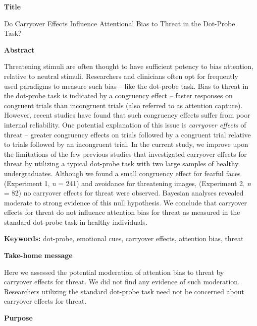 \documentclass{article}
\begin{document}
  \textbf{Title}

Do Carryover Effects Influence Attentional Bias to Threat in the Dot-Probe Task?



\textbf{Abstract}

Threatening stimuli are often thought to have sufficient potency to bias attention, relative to neutral stimuli. Researchers and clinicians often opt for frequently used paradigms to measure such bias -- like the dot-probe task. Bias to threat in the dot-probe task is indicated by a congruency effect -- faster responses on congruent trials than incongruent trials (also referred to as attention capture). However, recent studies have found that such congruency effects suffer from poor internal reliability. One potential explanation of this issue is \emph{carryover effects} of threat -- greater congruency effects on trials followed by a congruent trial relative to trials followed by an incongruent trial. In the current study, we improve upon the limitations of the few previous studies that investigated carryover effects for threat by utilizing a typical dot-probe task with two large samples of healthy undergraduates. Although we found a small congruency effect for fearful faces (Experiment 1, \emph{n} = 241) and avoidance for threatening images, (Experiment 2, \emph{n }= 82) no carryover effects for threat were observed. Bayesian analyses revealed moderate to strong evidence of this null hypothesis. We conclude that carryover effects for threat do not influence attention bias for threat as measured in the standard dot-probe task in healthy individuals.



\textbf{Keywords:} dot-probe, emotional cues, carryover effects, attention bias, threat







\textbf{Take-home message}

Here we assessed the potential moderation of attention bias to threat by carryover effects for threat. We did not find any evidence of such moderation. Researchers utilizing the standard dot-probe task need not be concerned about carryover effects for threat. 



\textbf{Purpose }
\end{document}

